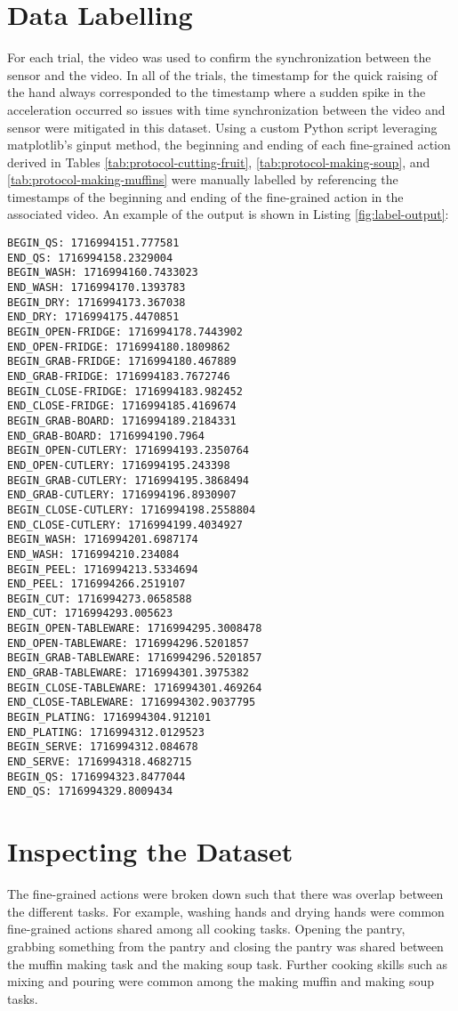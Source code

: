 \section{Data Labelling}
For each trial, the video was used to confirm the synchronization between the sensor and the video. In all of the trials, the timestamp for the quick raising of the hand always corresponded to the timestamp where a sudden spike in the acceleration occurred so issues with time synchronization between the video and sensor were mitigated in this dataset. Using a custom Python script leveraging matplotlib's ginput method, the beginning and ending of each fine-grained action derived in Tables \ref{tab:protocol-cutting-fruit}, \ref{tab:protocol-making-soup}, and \ref{tab:protocol-making-muffins} were manually labelled by referencing the timestamps of the beginning and ending of the fine-grained action in the associated video. An example of the output is shown in Listing \ref{fig:label-output}:


\begin{lstlisting}[label=fig:label-output, caption=Manual labelling output for the cutting fruit task.]
BEGIN_QS: 1716994151.777581
END_QS: 1716994158.2329004
BEGIN_WASH: 1716994160.7433023
END_WASH: 1716994170.1393783
BEGIN_DRY: 1716994173.367038
END_DRY: 1716994175.4470851
BEGIN_OPEN-FRIDGE: 1716994178.7443902
END_OPEN-FRIDGE: 1716994180.1809862
BEGIN_GRAB-FRIDGE: 1716994180.467889
END_GRAB-FRIDGE: 1716994183.7672746
BEGIN_CLOSE-FRIDGE: 1716994183.982452
END_CLOSE-FRIDGE: 1716994185.4169674
BEGIN_GRAB-BOARD: 1716994189.2184331
END_GRAB-BOARD: 1716994190.7964
BEGIN_OPEN-CUTLERY: 1716994193.2350764
END_OPEN-CUTLERY: 1716994195.243398
BEGIN_GRAB-CUTLERY: 1716994195.3868494
END_GRAB-CUTLERY: 1716994196.8930907
BEGIN_CLOSE-CUTLERY: 1716994198.2558804
END_CLOSE-CUTLERY: 1716994199.4034927
BEGIN_WASH: 1716994201.6987174
END_WASH: 1716994210.234084
BEGIN_PEEL: 1716994213.5334694
END_PEEL: 1716994266.2519107
BEGIN_CUT: 1716994273.0658588
END_CUT: 1716994293.005623
BEGIN_OPEN-TABLEWARE: 1716994295.3008478
END_OPEN-TABLEWARE: 1716994296.5201857
BEGIN_GRAB-TABLEWARE: 1716994296.5201857
END_GRAB-TABLEWARE: 1716994301.3975382
BEGIN_CLOSE-TABLEWARE: 1716994301.469264
END_CLOSE-TABLEWARE: 1716994302.9037795
BEGIN_PLATING: 1716994304.912101
END_PLATING: 1716994312.0129523
BEGIN_SERVE: 1716994312.084678
END_SERVE: 1716994318.4682715
BEGIN_QS: 1716994323.8477044
END_QS: 1716994329.8009434
\end{lstlisting}

\clearpage
\section{Inspecting the Dataset}
The fine-grained actions were broken down such that there was overlap between the different tasks. For example, washing hands and drying hands were common fine-grained actions shared among all cooking tasks. Opening the pantry, grabbing something from the pantry and closing the pantry was shared between the muffin making task and the making soup task. Further cooking skills such as mixing and pouring were common among the making muffin and making soup tasks. 

